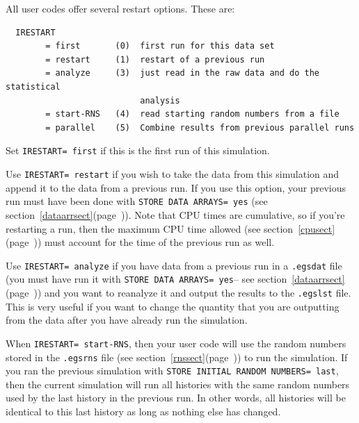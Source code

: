 \documentclass[12pt,twoside]{article}  %
\newcommand{\lpage}[1]{(page~\pageref{#1})}
\begin{document}
All user codes offer several restart options.  These are:

\begin{verbatim}
  IRESTART
        = first       (0)  first run for this data set
        = restart     (1)  restart of a previous run
        = analyze     (3)  just read in the raw data and do the statistical
                           analysis
        = start-RNS   (4)  read starting random numbers from a file
        = parallel    (5)  Combine results from previous parallel runs
\end{verbatim}

Set {\tt IRESTART= first} if this is the first run of this simulation.

Use {\tt IRESTART= restart} if you wish to take the data from this simulation
and append it to the data from a previous run.  If you use this option, your
previous run must have been done with {\tt STORE DATA ARRAYS= yes}
(see section~\ref{dataarrsect}\lpage{dataarrsect}).  Note that CPU times
are cumulative, so if you're restarting a run, then the maximum CPU time
allowed (see section~\ref{cpusect}\lpage{cpusect}) must account for the time of
the previous run as well.

Use {\tt IRESTART= analyze} if you have data from a previous run in
a {\tt .egsdat} file (you must have run it with {\tt STORE DATA ARRAYS= yes}--
see section~\ref{dataarrsect}\lpage{dataarrsect}) and you want to reanalyze it and output
the results to the {\tt .egslst} file.  This is very useful if
you want to change the quantity that you are outputting from the data after
you have already run the simulation.

When {\tt IRESTART= start-RNS}, then your user code will use the
random numbers stored in the {\tt .egsrns} file (see
section~\ref{rnssect}\lpage{rnssect}) to run the simulation.  If you ran the previous simulation
with {\tt STORE INITIAL RANDOM NUMBERS= last}, then the current simulation
will run all histories with the same random numbers used by the last
history in the previous run.  In other words, all histories will be identical
to this last history as long as nothing else has changed.

\end{document}
